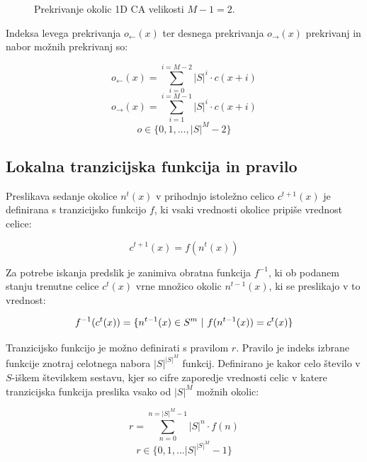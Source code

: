 \documentclass[12pt,a4paper,openany,twoside]{book}
\begin{document}
\begin{figure}[htb]
\centerline{}
\caption[Prekrivanje okolic 1D CA.]{Prekrivanje okolic 1D CA velikosti \(M-1=2\).}
\label{overlap_1d}
\end{figure}

Indeksa levega prekrivanja \(o_{\leftarrow}(x)\) ter desnega prekrivanja \(o_{\rightarrow}(x)\) prekrivanj in nabor možnih prekrivanj so:

\begin{equation}
o_{\leftarrow}(x) = \sum_{i=0}^{i=M-2} |S|^i \cdot c(x+i)
\end{equation}
\begin{equation}
o_{\rightarrow}(x) = \sum_{i=1}^{i=M-1} |S|^i \cdot c(x+i)
\end{equation}
\begin{equation}
o \in \{0, 1, \ldots, |S|^M-2\}
\end{equation}

\subsection{Lokalna tranzicijska funkcija in pravilo}

Preslikava sedanje okolice \(n^{t}(x)\) v prihodnjo istoležno celico \(c^{t+1}(x)\) je definirana
s tranzicijsko funkcijo \(f\), ki vsaki vrednosti okolice pripiše vrednost celice:

\begin{equation}
c^{t+1}(x) = f(n^{t}(x))
\end{equation}

Za potrebe iskanja predslik je zanimiva obratna funkcija \(f^{-1}\), ki ob
podanem stanju trenutne celice \(c^{t}(x)\) vrne množico okolic \(n^{t-1}(x)\),
ki se preslikajo v to vrednost:

\begin{equation}
f^{-1}(c^{t}(x)) = \{ n^{t-1}(x) \in S^m \ \arrowvert \ f(n^{t-1}(x)) = c^{t}(x) \}
\end{equation}

Tranzicijsko funkcijo je možno definirati s pravilom  \(r\).
Pravilo je indeks izbrane funkcije znotraj celotnega nabora \(|S|^{|S|^M}\) funkcij.
Definirano je kakor celo število v \(S\)-iškem številskem sestavu,
kjer so cifre zaporedje vrednosti celic v katere tranzicijska funkcija
preslika vsako od \(|S|^M\) možnih okolic:

\begin{equation}
r = \sum_{n=0}^{n=|S|^M-1} |S|^n \cdot f(n)
\end{equation}
\begin{equation}
r \in \{0, 1, \ldots |S|^{|S|^M}-1\}
\end{equation}
\end{document}

